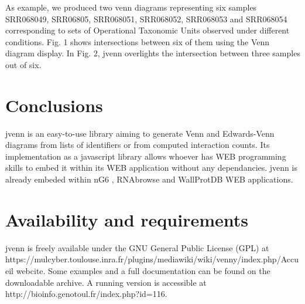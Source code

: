 \documentclass{bmcart}
\begin{document}
As example, we produced two venn diagrams representing six samples SRR068049, SRR06805, SRR068051, SRR068052, SRR068053 and 
SRR068054 corresponding to sets of Operational Taxonomic Units observed under different conditions. Fig. 1 shows intersections
between six of them using the Venn diagram display. In Fig. 2, jvenn overlights the intersection between three samples out of 
six.


\section*{Conclusions}

jvenn is an easy-to-use library aiming to generate Venn and Edwards-Venn diagrams from lists of identifiers or from
computed interaction counts. Its implementation as a javascript library allows whoever has WEB programming skills to embed it 
within its WEB application without any dependancies. jvenn is already embeded within nG6 \cite{Mariette2012}, RNAbrowse 
\cite{Mariette} and WallProtDB \cite{SanClemente} WEB applications.

\section*{Availability and requirements}

jvenn is freely available under the GNU General Public License (GPL) at 
https://mulcyber.toulouse.inra.fr/plugins/mediawiki/wiki/venny/index.php/Accueil webcite. Some examples and a full documentation 
can be found on the downloadable archive. A running version is accessible at http://bioinfo.genotoul.fr/index.php?id=116.

\end{document}
